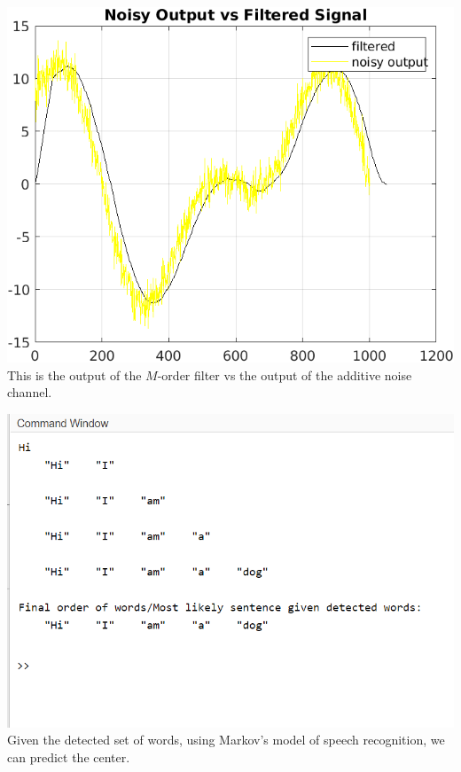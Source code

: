 \documentclass[10pt,twocolumn,letterpaper]{article}
\begin{document}
\begin{center}
    \includegraphics[scale=0.6]{noisyvsfilt.png}\\
    This is the output of the $M$-order filter vs the output of the additive noise channel.
\end{center}

\begin{center}
    \includegraphics[scale=0.6]{MarkovOutput.png}\\
    Given the detected set of words, using Markov's model of speech recognition, we can predict the center.
\end{center}
\end{document}
